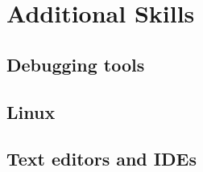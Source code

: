 \documentclass[letterpaper]{article}
\begin{document}
    \section*{Additional Skills}
        \subsection*{Debugging tools}
        \subsection*{Linux}
        \subsection*{Text editors and IDEs}
\end{document}
